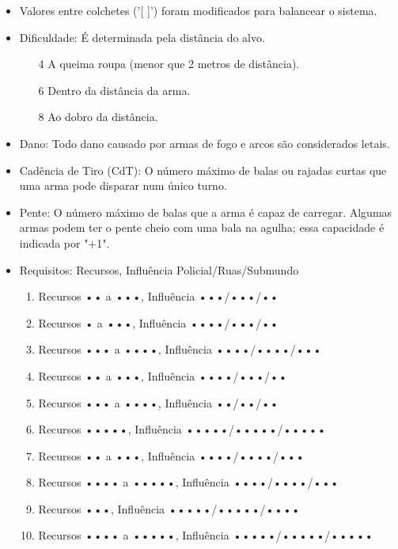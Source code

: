 \begin{itemize}[noitemsep]

\item Valores entre colchetes ('[ ]') foram modificados para balancear o sistema.

\item Dificuldade: É determinada pela distância do alvo.
\begin{itemize}[noitemsep]
  \item [4] A queima roupa (menor que 2 metros de distância).
  \item [6] Dentro da distância da arma.
  \item [8] Ao dobro da distância.
\end{itemize}

\item Dano: Todo dano causado por armas de fogo e arcos são considerados letais.

\item Cadência de Tiro (CdT): O número máximo de balas ou rajadas curtas que uma arma pode disparar num único turno.

\item Pente: O número máximo de balas que a arma é capaz de carregar. Algumas armas podem ter o pente cheio com uma bala na agulha; essa capacidade é indicada por "+1".

\item Requisitos: Recursos, Influência Policial/Ruas/Submundo
\begin{enumerate}
\item Recursos •• a •••, Influência •••/•••/•• \label{revolver}
\item Recursos • a •••, Influência ••••/•••/•• \label{pistola_leve}
\item Recursos ••• a ••••, Influência ••••/••••/••• \label{pistola_pesada}
\item Recursos •• a •••, Influência ••••/•••/•• \label{pistola_auto}
\item Recursos ••• a ••••, Influência ••/••/•• \label{barra_pesada}
\item Recursos •••••, Influência •••••/•••••/••••• \label{escopeta}
\item Recursos •• a •••, Influência ••••/••••/••• \label{subm_leve}
\item Recursos •••• a •••••, Influência ••••/••••/••• \label{fuzil_monotiro}
\item Recursos •••, Influência •••••/•••••/•••• \label{fuzil_assalto}
\item Recursos •••• a •••••, Influência •••••/•••••/••••• \label{rifle}
\end{enumerate}


\end{itemize}

